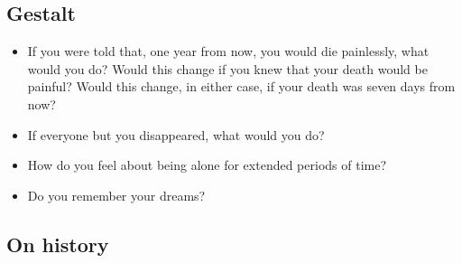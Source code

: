 \hypertarget{gestalt}{%
\subsection{Gestalt}\label{gestalt}}

\begin{itemize}
\tightlist
\item
  If you were told that, one year from now, you would die painlessly, what would you do? Would this change if you knew that your death would be painful? Would this change, in either case, if your death was seven days from now?
\item
  If everyone but you disappeared, what would you do?
\item
  How do you feel about being alone for extended periods of time?
\item
  Do you remember your dreams?
\end{itemize}

\hypertarget{on-history}{%
\subsection{On history}\label{on-history}}

